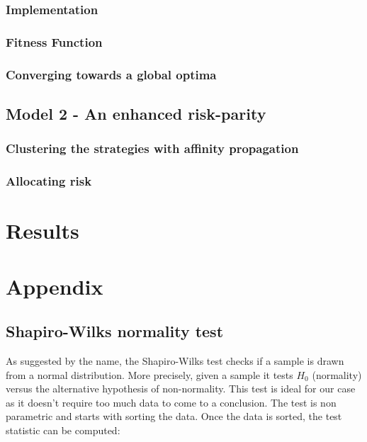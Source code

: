 \documentclass[12pt]{article} %
\numberwithin{equation}{subsection}
\begin{document}
\subsubsection{Implementation}



\subsubsection{Fitness Function}



\subsubsection{Converging towards a global optima}



\subsection{Model 2 - An enhanced risk-parity}



\subsubsection{Clustering the strategies with affinity propagation}

\subsubsection{Allocating risk}



\section*{Results}

\section*{Appendix}


\subsection*{Shapiro-Wilks normality test}

As suggested by the name, the Shapiro-Wilks test checks if a sample is drawn from a normal distribution. More precisely, given a sample it tests $H_0$ (normality) versus the alternative hypothesis of non-normality. This test is ideal for our case as it doesn't require too much data to come to a conclusion. The test is non parametric and starts with sorting the data. Once the data is sorted, the test statistic can be computed:
\end{document}
